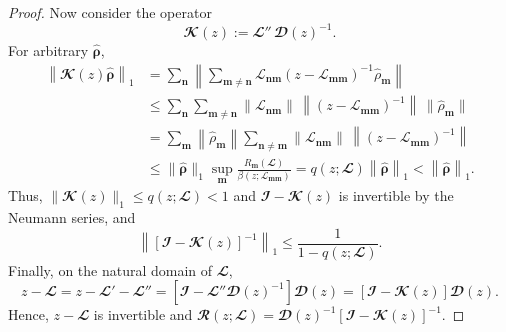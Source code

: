 \documentclass{SciPost}
\begin{document}
\begin{proof}
Now consider the operator
\begin{equation}
    \mathbfcal K(z)
    :=
    \mathbfcal L''\,\mathbfcal D(z)^{-1}.
\end{equation}
For arbitrary \(\hat{\bm\rho}\),
\begin{equation}
    \begin{aligned}
        \left \|\mathbfcal K(z)\hat{\bm\rho}\right \|_1
        &=
        \sum_{\bm n}
        \left\|
        \sum_{\bm m\ne \bm n}
        \mathcal L_{\bm n\bm m}
        (z-\mathcal L_{\bm m\bm m})^{-1}
        \hat\rho_{\bm m}
        \right\|
        \\
        &\leqslant
        \sum_{\bm n}\sum_{\bm m\ne \bm n}
        \|\mathcal L_{\bm n\bm m}\|\,
        \left \|(z-\mathcal L_{\bm m\bm m})^{-1}\right \|\,
        \|\hat\rho_{\bm m}\|
        \\
        &=
        \sum_{\bm m}
        \left \|\hat\rho_{\bm m}\right \|
        \sum_{\bm n\ne \bm m}
        \|\mathcal L_{\bm n\bm m}\|\,
        \left \|(z-\mathcal L_{\bm m\bm m})^{-1}\right \|
        \\
        &\leqslant
        \|\hat{\bm\rho}\|_1
        \sup_{\bm m}
        \frac{R_{\bm m}(\mathbfcal L)}
        {\beta(z;\mathcal L_{\bm{mm}})}
        =
        q(z;\mathbfcal L)\left\|\hat{\bm\rho}\right\|_1 < \left\|\hat{\bm\rho}\right\|_1.
    \end{aligned}
\end{equation}
Thus, $\|\mathbfcal K(z)\|_1 \leqslant q(z;\mathbfcal L) < 1$ and
 \(\mathbfcal I-\mathbfcal K(z)\) is invertible by the Neumann series, and
\begin{equation}
    \left \|[\mathbfcal I-\mathbfcal K(z)]^{-1}\right \|_1
    \leqslant
    \frac{1}{1-q(z;\mathbfcal L)}.
\end{equation}
Finally, on the natural domain of \(\mathbfcal L\),
\begin{equation}
    z-\mathbfcal L
    =
    z-\mathbfcal L' - \mathbfcal L''
    =
    \left[\mathbfcal I-\mathbfcal L''\mathbfcal D(z)^{-1}\right]\mathbfcal D(z)
    =
    [\mathbfcal I-\mathbfcal K(z)]\mathbfcal D(z).
\end{equation}
Hence, \(z-\mathbfcal L\) is invertible and
    $\mathbfcal R(z;\mathbfcal L)
    =
    \mathbfcal D(z)^{-1}
    [\mathbfcal I-\mathbfcal K(z)]^{-1}.
    $


\end{proof}
\end{document}
